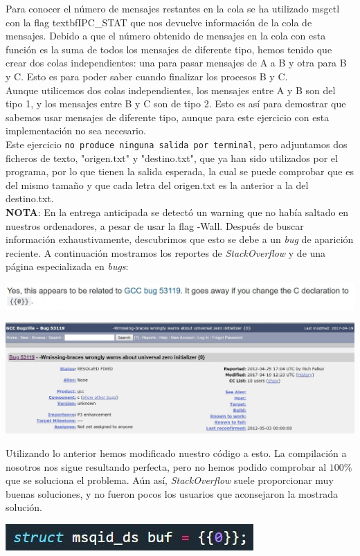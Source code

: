 \documentclass[12pt]{article}
\begin{document}
Para conocer el número de mensajes restantes en la cola se ha utilizado msgctl con la flag textbf{IPC\_STAT} que nos devuelve información de la cola de mensajes. Debido a que el número obtenido de mensajes en la cola con esta función es la suma de todos los mensajes de diferente tipo, hemos tenido que crear dos colas independientes: una para pasar mensajes de A a B y otra para B y C. Esto es para poder saber cuando finalizar los procesos B y C.\\

Aunque utilicemos dos colas independientes, los mensajes entre A y B son del tipo 1, y los mensajes entre B y C son de tipo 2. Esto es así para demostrar que sabemos usar mensajes de diferente tipo, aunque para este ejercicio con esta implementación no sea necesario.\\

Este ejercicio \texttt{no produce ninguna salida por terminal}, pero adjuntamos dos ficheros de texto, "origen.txt" y "destino.txt", que ya han sido utilizados por el programa, por lo que tienen la salida esperada, la cual se puede comprobar que es del mismo tamaño y que cada letra del origen.txt es la anterior a la del destino.txt.\\

\textbf{NOTA}: En la entrega anticipada se detectó un warning que no había saltado en nuestros ordenadores, a pesar de usar la flag -Wall. Después de buscar información exhaustivamente, descubrimos que esto se debe a un \emph{bug} de aparición reciente. A continuación mostramos los reportes de \emph{StackOverflow} y de una página especializada en \emph{bugs}:
\begin{center}
	\includegraphics[scale=0.9]{sofSolution.JPG}
\end{center}
\begin{center}
	\includegraphics[scale=0.55]{bug.JPG}
\end{center}
Utilizando lo anterior hemos modificado nuestro código a esto. La compilación a nosotros nos sigue resultando perfecta, pero no hemos podido comprobar al $100\%$ que se soluciona el problema. Aún así, \emph{StackOverflow} suele proporcionar muy buenas soluciones, y no fueron pocos los usuarios que aconsejaron la mostrada solución.
\begin{center}
	\includegraphics[scale=1]{miSolucion.JPG}
\end{center}
\end{document}
